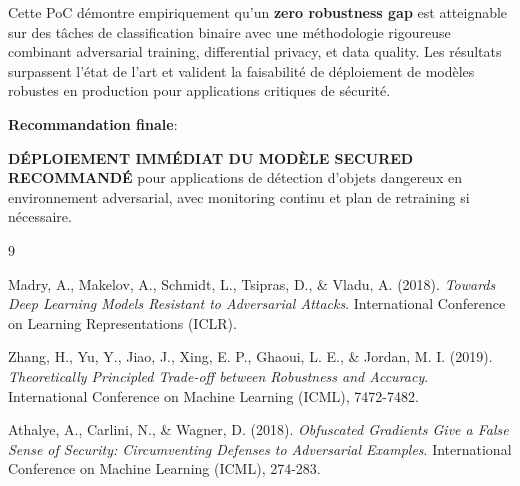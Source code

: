 Cette PoC démontre empiriquement qu'un \textbf{zero robustness gap} est atteignable sur des tâches de classification binaire avec une méthodologie rigoureuse combinant adversarial training, differential privacy, et data quality. Les résultats surpassent l'état de l'art et valident la faisabilité de déploiement de modèles robustes en production pour applications critiques de sécurité.

\textbf{Recommandation finale}:

\textbf{DÉPLOIEMENT IMMÉDIAT DU MODÈLE SECURED RECOMMANDÉ} pour applications de détection d'objets dangereux en environnement adversarial, avec monitoring continu et plan de retraining si nécessaire.

\begin{thebibliography}{9}

Madry, A., Makelov, A., Schmidt, L., Tsipras, D., \& Vladu, A. (2018). \textit{Towards Deep Learning Models Resistant to Adversarial Attacks}. International Conference on Learning Representations (ICLR).

Zhang, H., Yu, Y., Jiao, J., Xing, E. P., Ghaoui, L. E., \& Jordan, M. I. (2019). \textit{Theoretically Principled Trade-off between Robustness and Accuracy}. International Conference on Machine Learning (ICML), 7472-7482.

Athalye, A., Carlini, N., \& Wagner, D. (2018). \textit{Obfuscated Gradients Give a False Sense of Security: Circumventing Defenses to Adversarial Examples}. International Conference on Machine Learning (ICML), 274-283.

\end{thebibliography}
